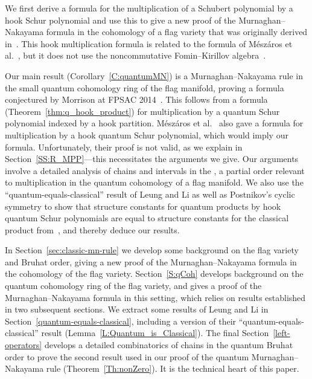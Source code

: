 \documentclass[11pt]{article}
\theoremstyle{definition}
\numberwithin{equation}{section}
\newcommand{\defcolor}[1]{{\color{RoyalBlue}#1}}
\newcommand{\demph}[1]{\defcolor{{\sl #1}}}
\begin{document}
We first derive a formula for the multiplication of a Schubert polynomial by a hook Schur polynomial and use this to give a
new proof of the 
Murnaghan--Nakayama formula in the cohomology of a flag variety that was originally derived in~\cite{MorrisonSottile}.
This hook multiplication formula is related to the formula of M{\'e}sz{\'a}ros et al.~\cite[Thm.~2]{MPP}, but it does not use
the noncommutative Fomin--Kirillov algebra~\cite{FominKirillov}.

Our main result (Corollary~\ref{C:quantumMN}) is a Murnaghan--Nakayama rule in the small quantum cohomology
ring of the flag manifold, proving a formula conjectured by Morrison at FPSAC
2014~\cite{Morrison}.
This follows from a  formula (Theorem~\ref{thm:q_hook_product}) for multiplication by a quantum Schur polynomial indexed by
a hook partition. 
M{\'e}sz{\'a}ros et al.~\cite[Thm.~15]{MPP} also gave a formula for multiplication by a hook quantum Schur
polynomial, which would imply our formula.
Unfortunately, their proof is not valid, as we explain in Section~\ref{SS:R_MPP}---this necessitates the arguments we give.
Our arguments involve a detailed analysis of chains and intervals in the \demph{quantum Bruhat order}, a partial order relevant to
multiplication in the quantum cohomology of a flag manifold.
We also use the ``quantum-equals-classical'' result of Leung and Li \cite{LeungLi2012} as well as
Postnikov's cyclic symmetry \cite{Postnikov_symmetry} to show that structure constants for quantum products by hook quantum
Schur 
polynomials are equal to structure constants for the classical product from~\cite{So96}, and thereby deduce our results.

In Section~\ref{sec:classic-mn-rule} we develop some background on the flag variety and Bruhat order, giving a new proof of the
Murnaghan--Nakayama formula in the cohomology of the flag variety.
Section~\ref{S:qCoh} develops background on the quantum cohomology ring of the flag variety, and gives a proof of the 
Murnaghan--Nakayama formula in this setting, which relies on results established in two subsequent
sections.
We extract some results of Leung and Li \cite{LeungLi2012} in Section~\ref{quantum-equals-classical}, including a version
of their  ``quantum-equals-classical'' result (Lemma~\ref{L:Quantum_is_Classical}).
The final Section~\ref{left-operators} develops a detailed combinatorics of chains in the quantum Bruhat order to prove the second
result used in our proof of the quantum Murnaghan--Nakayama rule (Theorem~\ref{Th:nonZero}).
It is the technical heart of this paper.
\end{document}
